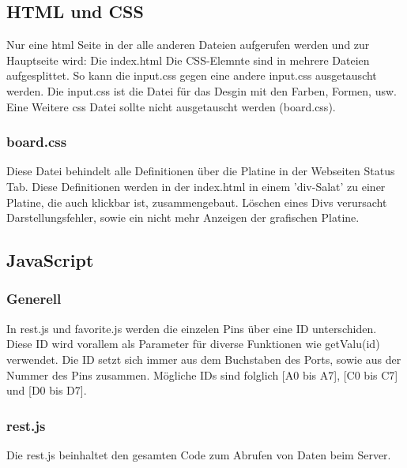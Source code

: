 \subsection{HTML und CSS}
Nur eine html Seite in der alle anderen Dateien aufgerufen werden und zur
Hauptseite wird: Die index.html\newline
Die CSS-Elemnte sind in mehrere Dateien aufgesplittet. So kann die input.css
gegen eine andere input.css ausgetauscht werden. Die input.css ist die Datei für
das Desgin mit den Farben, Formen, usw.\newline
Eine Weitere css Datei sollte nicht ausgetauscht werden (board.css).

\subsubsection{board.css}
Diese Datei behindelt alle Definitionen über die Platine in der Webseiten Status
Tab. Diese Definitionen werden in der index.html in einem 'div-Salat' zu einer
Platine, die auch klickbar ist, zusammengebaut. Löschen eines Divs verursacht
Darstellungsfehler, sowie ein nicht mehr Anzeigen der grafischen Platine.

\subsection{JavaScript}
\subsubsection{Generell}
In \textrm{rest.js} und \textrm{favorite.js} werden die einzelen Pins über eine
ID unterschiden. Diese ID wird vorallem als Parameter für diverse Funktionen wie
\textrm{getValu(id)} verwendet. Die ID setzt sich immer aus dem Buchstaben des
Ports, sowie aus der Nummer des Pins zusammen. Mögliche IDs sind folglich [A0
bis A7], [C0 bis C7] und [D0 bis D7].

\subsubsection{rest.js}
Die \textrm{rest.js} beinhaltet den gesamten Code zum Abrufen von Daten beim
Server.


